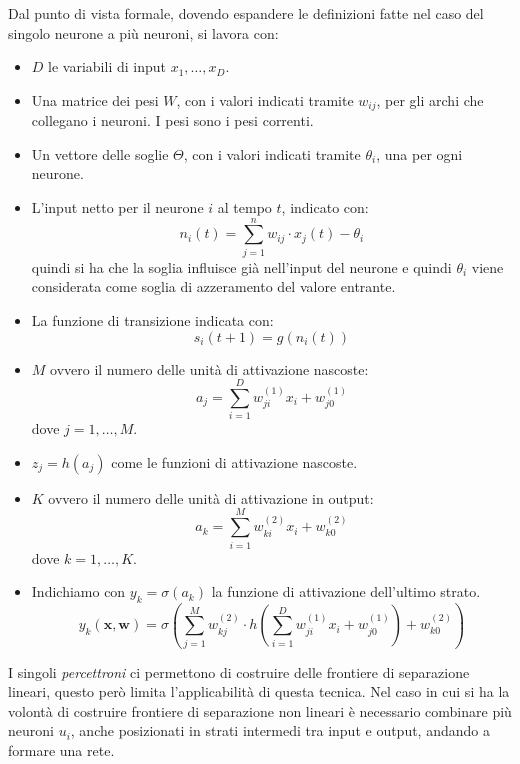 Dal punto di vista formale, dovendo espandere le definizioni fatte nel caso del singolo neurone a più neuroni, si lavora con:
\begin{itemize}
    \item $D$ le variabili di input $x_1, \dots, x_D$.
    \item Una matrice dei pesi $W$, con i valori indicati tramite $w_{ij}$, per gli archi che collegano i neuroni. I pesi sono i pesi correnti.
    \item Un vettore delle soglie $\Theta$, con i valori indicati tramite $\theta_i$, una per ogni neurone.
    \item L'input netto per il neurone $i$ al tempo $t$, indicato con: 
    \begin{equation}
        n_i(t) = \sum_{j = 1}^n w_{ij} \cdot x_j(t) - \theta_i
    \end{equation}
    quindi si ha che la soglia influisce già nell'input del neurone e quindi $\theta_i$ viene considerata come soglia di azzeramento del valore entrante.
    \item La funzione di transizione indicata con:
    \begin{equation}
        s_i(t + 1) = g(n_i(t))
    \end{equation}
    \item $M$ ovvero il numero delle unità di attivazione nascoste:
    \begin{equation}
        a_j = \sum_{i = 1}^D w_{ji}^{(1)}x_i + w_{j0}^{(1)}
    \end{equation}
    dove $j = 1, \dots, M$.
    \item $z_j = h(a_j)$ come le funzioni di attivazione nascoste.
    \item $K$ ovvero il numero delle unità di attivazione in output:
    \begin{equation}
        a_k = \sum_{i = 1}^M w_{ki}^{(2)}x_i + w_{k0}^{(2)}
    \end{equation}
    dove $k = 1, \dots, K$.
    \item Indichiamo con $y_k = \sigma(a_k)$ la funzione di attivazione dell'ultimo strato. 
    \begin{equation}
        y_k(\textbf{x}, \textbf{w}) = \sigma \left(\sum_{j = 1}^M w_{kj}^{(2)} \cdot h \left(\sum_{i = 1}^D w_{ji}^{(1)}x_i + w_{j0}^{(1)}\right) + w_{k0}^{(2)}\right)
    \end{equation}
\end{itemize}

I singoli \textit{percettroni} ci permettono di costruire delle frontiere di separazione lineari, questo però limita l'applicabilità di questa tecnica. Nel caso in cui si ha la volontà di costruire frontiere di separazione non lineari è necessario combinare più neuroni $u_i$, anche posizionati in strati intermedi tra input e output, andando a formare una rete.

